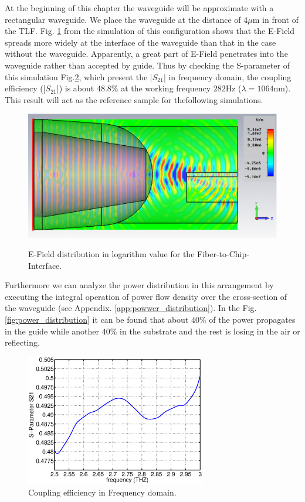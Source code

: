 At the beginning of this chapter the waveguide will be approximate with a rectangular waveguide. We place the waveguide at the distance of $4\mu$m in front of the TLF.  Fig. \ref{fig:coupling_e_field} from the simulation of this configuration shows that the E-Field spreads more widely at the interface of the waveguide than that in the case without the waveguide. Apparently, a great part of E-Field penetrates into the waveguide rather than accepted by guide. Thus by checking the S-parameter of this simulation Fig.\ref{fig:orignial_coupling_efficiency}, which present the |$S_{21}$| in frequency domain, the coupling efficiency (|$S_{21}$|) is about $48.8\%$ at the working frequency $282$Hz ($\lambda=1064$nm). This result will act as the reference sample for thefollowing simulations.\\ 
\begin{figure}[!ht]
\centering
	\includegraphics[width=0.7 \textwidth]{bilder/cst_basic_waveguide_efield}
	\label{fig:coupling_e_field}
	\caption{E-Field distribution in logarithm value for the Fiber-to-Chip-Interface.}
\end{figure}
Furthermore we can analyze the power distribution in this arrangement by executing the integral operation of power flow density over the cross-section of the waveguide (see Appendix. \ref{app:powwer_distribution}).  In the Fig. \ref{fig:power_distribution} it can be found that about $40\%$ of the power propagates in the guide while another $40\%$ in the substrate and the rest is losing in the air or reflecting.
\begin{figure}
\centering
\includegraphics[width=0.7\textwidth]{bilder/original_coupling_efficiency}
\caption{Coupling efficiency in Frequency domain.}
\label{fig:orignial_coupling_efficiency}
\end{figure}
